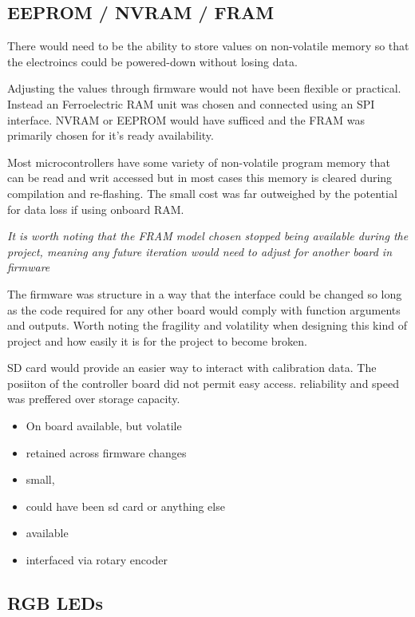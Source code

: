 \subsection{EEPROM / NVRAM / FRAM}\label{eeprom-nvram-fram}

There would need to be the ability to store values on non-volatile
memory so that the electroincs could be powered-down without losing
data.

Adjusting the values through firmware would not have been flexible or
practical. Instead an Ferroelectric RAM unit was chosen and connected
using an SPI interface. NVRAM or EEPROM would have sufficed and the FRAM
was primarily chosen for it's ready availability.

Most microcontrollers have some variety of non-volatile program memory
that can be read and writ accessed but in most cases this memory is
cleared during compilation and re-flashing. The small cost was far
outweighed by the potential for data loss if using onboard RAM.

\emph{It is worth noting that the FRAM model chosen stopped being
available during the project, meaning any future iteration would need to
adjust for another board in firmware}

The firmware was structure in a way that the interface could be changed
so long as the code required for any other board would comply with
function arguments and outputs. Worth noting the fragility and
volatility when designing this kind of project and how easily it is for
the project to become broken.

SD card would provide an easier way to interact with calibration data.
The posiiton of the controller board did not permit easy access.
reliability and speed was preffered over storage capacity.

\begin{itemize}
\tightlist
\item
  On board available, but volatile
\item
  retained across firmware changes
\item
  small,
\item
  could have been sd card or anything else
\item
  available
\item
  interfaced via rotary encoder
\end{itemize}

\subsection{RGB LEDs}\label{rgb-leds}

